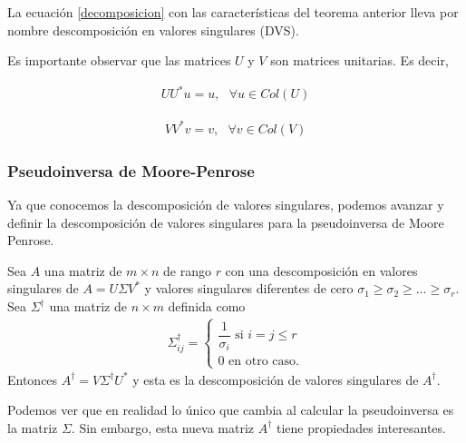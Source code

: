 La ecuación \ref{decomposicion} con las características del teorema anterior lleva por nombre descomposición en valores singulares (DVS). 


Es importante observar que las matrices $U$ y $V$ son matrices unitarias. Es decir, 

\begin{equation*}
    \begin{aligned}
    U U^{*} u = u, \text{ } \forall u \in Col (U)
    \end{aligned}
\end{equation*}

\begin{equation*}
    \begin{aligned}
    V V^{*} v = v, \text{ } \forall v \in Col (V)
    \end{aligned}
\end{equation*}

\subsubsection{Pseudoinversa de Moore-Penrose}

Ya que conocemos la descomposición de valores singulares, podemos avanzar y definir la descomposición de valores singulares para la pseudoinversa de Moore Penrose. 

\begin{theorem}
Sea $A$ una matriz de $m \times n$ de rango $r$ con una descomposición en valores singulares de $A = U \Sigma V^{*}$ y valores singulares diferentes de cero $\sigma_1 \geq \sigma_2 \geq \dots \geq \sigma_r$. Sea $\Sigma^{\dagger}$ una matriz de $n \times m$ definida como
\begin{equation*}
    \begin{aligned}
   \Sigma^{\dagger}_{ij} =
   \begin{cases}
   \dfrac{1}{\sigma_i} \text{ si } i = j \leq r\\
   0 \text{ en otro caso.}
   \end{cases}
    \end{aligned}
\end{equation*}
Entonces $A^{\dagger} = V \Sigma^{\dagger} U ^{*}$ y esta es la descomposición de valores singulares de $A^{\dagger}$. 
\cite[p.~414]{friedberglinearalgebra}
\end{theorem}

Podemos ver que en realidad lo único que cambia al calcular la pseudoinversa es la matriz $\Sigma$. Sin embargo, esta nueva matriz $A^{\dagger}$ tiene propiedades interesantes. 

